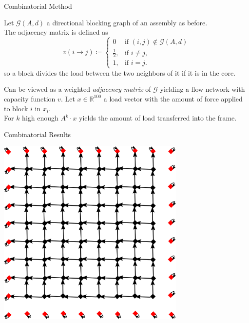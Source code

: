 \documentclass{beamer}
\numberwithin{equation}{aufgabe}
\newcommand\R{\mathbb R}
\begin{document}
\begin{frame}{Combinatorial Method}
    \begin{definition}
        Let $\mathcal{G}(A,d)$ a directional blocking graph of an assembly as before.\\
        The adjacency matrix is defined as \pause
        $$v(i\to j) \coloneqq 
            \begin{cases}
                0               & \text{if } (i,j) \notin \mathcal{G}(A,d)\\
                \frac{1}{2},    & \text{if } i\neq j,\\
                1,              & \text{if } i=j.
            \end{cases}$$
        so a block divides the load between the two neighbors of it if it is in the core.
    \end{definition}
    \pause
    Can be viewed as a weighted \emph{adjacency matrix} of $\mathcal{G}$ yielding a flow network with capacity function $v$.
    \pause
    Let $x \in \R^{100}$ a load vector with the amount of force applied to block $i$ in $x_i$.\\
    For $k$ high enough $A^k \cdot x$ yields the amount of load transferred into the frame.
\end{frame}

\begin{frame}{Combinatorial Results}
    \begin{center}
        \includegraphics[width=0.7\textwidth]{images/flowp1.png}
    \end{center}
\end{frame}
\end{document}
